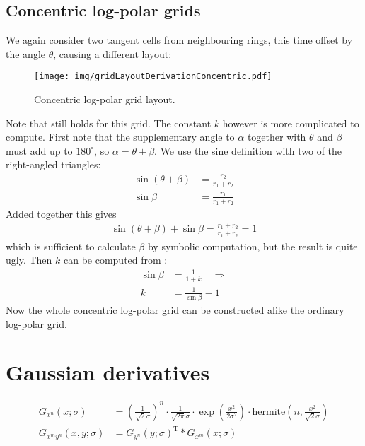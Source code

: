\documentclass[thesis.tex]{subfiles}
\begin{document}
\section{Concentric log-polar grids}
%
We again consider two tangent cells from neighbouring rings, this time offset by the angle $\theta$, causing a different layout:
%
\begin{figure}[H]
	\centering
	\texttt{[image: img/gridLayoutDerivationConcentric.pdf]}
    \caption{Concentric log-polar grid layout.}
    \label{fig:gridLayoutDerivationConcentric}
\end{figure}
\noindent
%
Note that  still holds for this grid. The constant $k$ however is more complicated to compute. First note that the supplementary angle to $\alpha$ together with $\theta$ and $\beta$ must add up to $180^\circ$, so $\alpha = \theta + \beta$. We use the sine definition with two of the right-angled triangles:
%
\begin{align}
\sin (\theta + \beta) &= \frac{r_2}{r_1 + r_2} \nonumber \\
\sin \beta &= \frac{r_1}{r_1 + r_2} \label{eq:kFromBeta}
\end{align}
%
Added together this gives
%
\begin{align*}
\sin (\theta + \beta) + \sin \beta = \frac{r_1 + r_2}{r_1 + r_2} = 1
\end{align*}
%
which is sufficient to calculate $\beta$ by symbolic computation, but the result is quite ugly. Then $k$ can be computed from :
%
\begin{align*}
\sin \beta &= \frac{1}{1 + k} \quad\Rightarrow \\
k &= \frac{1}{\sin \beta} - 1
\end{align*}
%
Now the whole concentric log-polar grid can be constructed alike the ordinary log-polar grid.
%
\chapter{Gaussian derivatives}
%
\begin{align*}
	G_{x^n}(x;\sigma) &= \left(\frac{1}{\sqrt{2}\sigma}\right)^n \cdot
						 \frac{1}{\sqrt{2\pi}\sigma} \cdot
						 \exp \left( \frac{x^2}{2\sigma^2} \right) \cdot
						 \text{hermite} \left(n,\frac{x^2}{\sqrt{2}\sigma} \right) \\
	G_{x^m y^n}(x,y;\sigma) &=
						G_{y^n}(y;\sigma)^\text{T} \ast G_{x^m}(x;\sigma)
\end{align*}
\subbibliography
\end{document}

